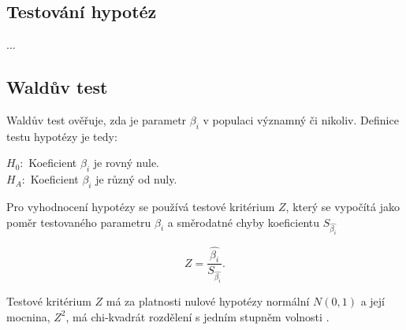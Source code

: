 \subsection{Testování hypotéz}
...

\subsection{Waldův test}
Waldův test ověřuje, zda je parametr $\beta_i$ v populaci významný či nikoliv. Definice testu hypotézy je tedy:

$H_0:$ Koeficient $\beta_i$ je rovný nule. \\
$H_A:$ Koeficient $\beta_i$ je různý od nuly.

Pro vyhodnocení hypotézy se používá
{\color{red}
testové kritérium
}
$Z$, který se vypočítá jako poměr testovaného parametru $\beta_i$
a směrodatné chyby koeficientu $S_{\hat{\beta_i}}$

\begin{equation}
    Z = \frac{\hat{\beta_i}}{S_{\hat{\beta_i}}}.
\end{equation}

{\color{red}
Testové kritérium
}
$Z$ má za platnosti nulové hypotézy normální $N(0, 1)$ a její mocnina, $Z^2$, má chi-kvadrát rozdělení s jedním stupněm volnosti \cite{kleinbaum_logistic_2010}.
